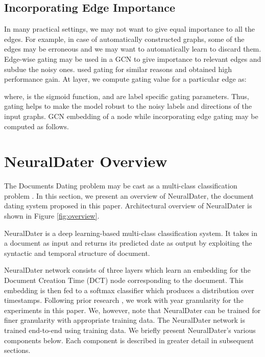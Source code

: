 \documentclass[11pt,a4paper]{article}
\newcommand{\reffig}[1]{Figure \ref{#1}}
\newcommand{\method}{NeuralDater}
\begin{document}
\subsection{Incorporating Edge Importance}
\label{sec:gating}

In many practical settings, we may not want to give equal importance to all the edges. For example, in case of automatically constructed graphs, some of the edges may be erroneous and we may want to automatically learn to discard them. Edge-wise gating may be used in a GCN to give importance to relevant edges and subdue the noisy ones. \citet{gcn_event, gcn_srl} used gating for similar reasons and obtained high performance gain. At  layer, we compute gating value for a particular edge  as:

where,  is the sigmoid function,  and  are label specific gating parameters. Thus, gating helps to make the model robust to the noisy labels and directions of the input graphs. GCN embedding of a node while incorporating edge gating may be computed as follows.







\section{\method{} Overview}
\label{sec:method}

The Documents Dating problem may be cast as a multi-class classification problem \cite{Kotsakos:2014:BAD:2600428.2609495,Chambers:2012:LDT:2390524.2390539}. In this section, we present an overview of \method{}, the document dating system proposed in this paper. Architectural overview of \method{} is shown in \reffig{fig:overview}.

\method{} is a deep learning-based multi-class classification system. It takes in a document as input and returns its predicted date as output by exploiting the syntactic and temporal structure of document. 

\method{} network consists of three layers which learn an  embedding for the Document Creation Time (DCT) node corresponding to the document. This embedding is then fed to a softmax classifier which produces a distribution over timestamps. Following prior research \cite{Chambers:2012:LDT:2390524.2390539,Kotsakos:2014:BAD:2600428.2609495}, we work with year granularity for the experiments in this paper.  We, however, note that NeuralDater can be trained for finer granularity with appropriate training data. The \method{} network is trained end-to-end using training data. We briefly present \method{}'s various components below. Each component is described in greater detail in subsequent sections.
\end{document}
